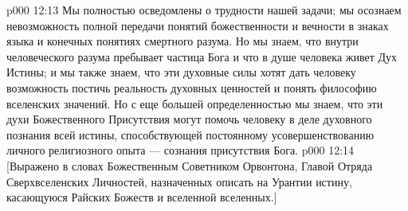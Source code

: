 \vs p000 12:13 Мы полностью осведомлены о трудности нашей задачи; мы осознаем невозможность полной передачи понятий божественности и вечности в знаках языка и конечных понятиях смертного разума. Но мы знаем, что внутри человеческого разума пребывает частица Бога и что в душе человека живет Дух Истины; и мы также знаем, что эти духовные силы хотят дать человеку возможность постичь реальность духовных ценностей и понять философию вселенских значений. Но с еще большей определенностью мы знаем, что эти духи Божественного Присутствия могут помочь человеку в деле духовного познания всей истины, способствующей постоянному усовершенствованию личного религиозного опыта --- сознания присутствия Бога.
\vs p000 12:14 [Выражено в словах Божественным Советником Орвонтона, Главой Отряда Сверхвселенских Личностей, назначенных описать на Урантии истину, касающуюся Райских Божеств и вселенной вселенных.]
